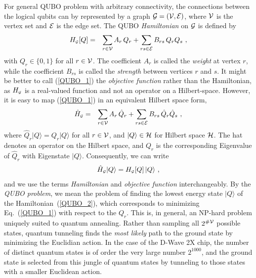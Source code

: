 \documentclass[preprint,12pt,eqsecnum,nofootinbib,amsmath,amssymb]{revtex4}
\begin{document}
For general QUBO problem with arbitrary connectivity, the connections between the logical qubits can by represented 
by a graph ${\cal G} =( {\cal V} ,  {\cal E} )$, where ${\cal V}$ is the vertex set and ${\cal E}$ is the edge set. 
The QUBO {\em Hamiltonian} on ${\cal G}$ is defined by
%
\begin{eqnarray}
  H_{\scriptscriptstyle {\cal G}}[Q] 
  &=&
  \sum_{r \in {\cal V}} A_r\, Q_r
  +
  \sum_{rs \in {\cal E}} B_{r s} \,  Q_r  Q_s
  \ ,
  \label{QUBO_1}
\end{eqnarray}
%
with $Q_r \in \{0, 1 \}$ for all $r \in {\cal V}$. The coefficient $A_r$ is called the
{\em weight} at vertex $r$, while the coefficient $B_{rs}$ is called the {\em strength} 
between vertices $r$ and $s$.  It might be better to call (\ref{QUBO_1}) 
the {\em objective function} rather than the Hamiltonian, as $H_{\scriptscriptstyle {\cal G}}$ 
is a real-valued function and not an operator on a Hilbert-space. However, it is easy to 
map (\ref{QUBO_1}) in an equivalent Hilbert space form, 
%
\begin{eqnarray}
  \hat H_{\scriptscriptstyle {\cal G}}
  &=&
  \sum_{r \in {\cal V}} A_r\, \hat Q_r
  +
  \sum_{r s \in {\cal E}} B_{r s} \,  \hat Q_r  \hat Q_s
  \ ,
  \label{QUBO_2}
\end{eqnarray}
%
where $\hat Q_r \vert Q \rangle = Q_r \vert Q \rangle$ for all $r \in {\cal V}$, and 
$\vert Q \rangle \in {\cal H}$ for  Hilbert space $\cal H$. The hat denotes 
an operator on the Hilbert space, and $Q_r$ is the corresponding Eigenvalue of
$\hat Q_r$ with Eigenstate $\vert Q \rangle$. Consequently, we can write
%
\begin{eqnarray}
  \hat H_{\scriptscriptstyle {\cal G}} \vert Q \rangle 
  = H_{\scriptscriptstyle {\cal G}}[Q] \, \vert Q \rangle
  \ ,
  \label{QUBO_3}
\end{eqnarray}
%
and we use the terms {\em Hamiltonian} and {\em objective function} interchangeably.
By the {\em QUBO problem}, we mean the problem of finding the lowest energy state 
$\vert Q \rangle $ of the Hamiltonian~(\ref{QUBO_2}), which corresponds to minimizing 
Eq.~(\ref{QUBO_1}) with respect to the $Q_r$. This is, in general, an NP-hard problem 
uniquely suited to quantum annealing.  Rather than sampling all $2^{\# {\cal V} }$ possible 
states, quantum tunneling finds the {\em most likely} path to the ground state by 
minimizing the Euclidian action. In the case of the D-Wave 2X chip, the number of 
distinct quantum states is of order the very large number $2^{1000}$, and the 
ground state is selected from this jungle of quantum states by tunneling to those
states with a smaller Euclidean action. 
\end{document}
